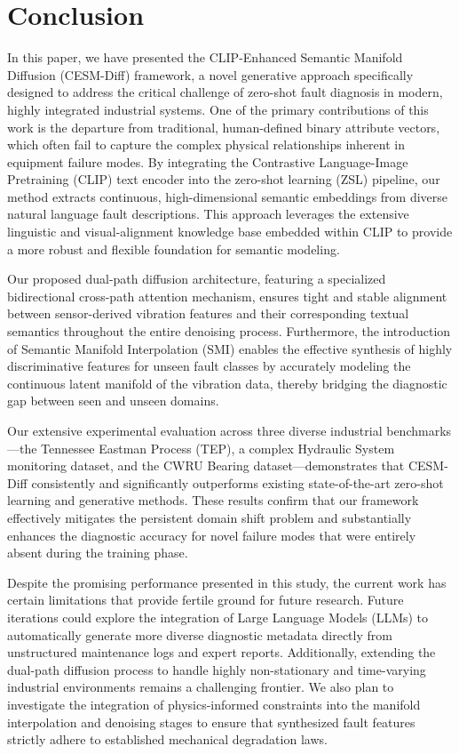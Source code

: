 \documentclass[journal,12pt,onecolumn]{IEEEtran}
\begin{document}
\section{Conclusion}
\label{sec:conclusion}

In this paper, we have presented the CLIP-Enhanced Semantic Manifold Diffusion (CESM-Diff) framework, a novel generative approach specifically designed to address the critical challenge of zero-shot fault diagnosis in modern, highly integrated industrial systems. One of the primary contributions of this work is the departure from traditional, human-defined binary attribute vectors, which often fail to capture the complex physical relationships inherent in equipment failure modes. By integrating the Contrastive Language-Image Pretraining (CLIP) text encoder into the zero-shot learning (ZSL) pipeline, our method extracts continuous, high-dimensional semantic embeddings from diverse natural language fault descriptions. This approach leverages the extensive linguistic and visual-alignment knowledge base embedded within CLIP to provide a more robust and flexible foundation for semantic modeling.

Our proposed dual-path diffusion architecture, featuring a specialized bidirectional cross-path attention mechanism, ensures tight and stable alignment between sensor-derived vibration features and their corresponding textual semantics throughout the entire denoising process. Furthermore, the introduction of Semantic Manifold Interpolation (SMI) enables the effective synthesis of highly discriminative features for unseen fault classes by accurately modeling the continuous latent manifold of the vibration data, thereby bridging the diagnostic gap between seen and unseen domains.

Our extensive experimental evaluation across three diverse industrial benchmarks---the Tennessee Eastman Process (TEP), a complex Hydraulic System monitoring dataset, and the CWRU Bearing dataset---demonstrates that CESM-Diff consistently and significantly outperforms existing state-of-the-art zero-shot learning and generative methods. These results confirm that our framework effectively mitigates the persistent domain shift problem and substantially enhances the diagnostic accuracy for novel failure modes that were entirely absent during the training phase.

Despite the promising performance presented in this study, the current work has certain limitations that provide fertile ground for future research. Future iterations could explore the integration of Large Language Models (LLMs) to automatically generate more diverse diagnostic metadata directly from unstructured maintenance logs and expert reports. Additionally, extending the dual-path diffusion process to handle highly non-stationary and time-varying industrial environments remains a challenging frontier. We also plan to investigate the integration of physics-informed constraints into the manifold interpolation and denoising stages to ensure that synthesized fault features strictly adhere to established mechanical degradation laws.
\end{document}

